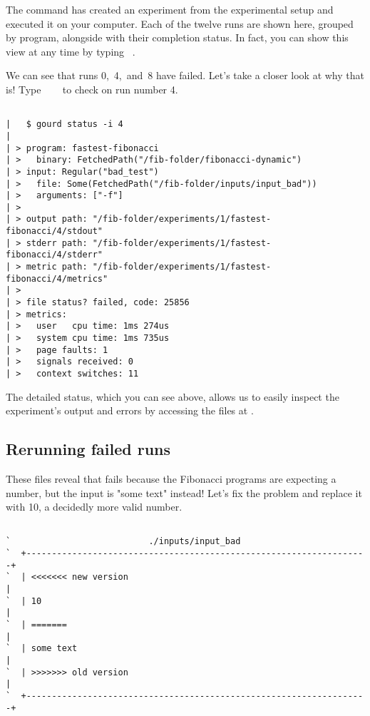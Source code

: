 \documentclass[a4paper,english]{article}
\begin{document}
\begin{adjustwidth}{18pt}{0pt}
    The  command has created an experiment from the experimental
    setup and executed it on your computer. Each of the twelve runs are shown
    here, grouped by program, alongside with their completion status. In fact,
    you can show this view at any time by typing ~.

    We can see that runs 0,~4,~and~8 have failed. Let's take a closer look at
    why that is! Type ~~~ to check on
    run number 4.

    \begin{verbatim}

|   $ gourd status -i 4
|
| > program: fastest-fibonacci
| >   binary: FetchedPath("/fib-folder/fibonacci-dynamic")
| > input: Regular("bad_test")
| >   file: Some(FetchedPath("/fib-folder/inputs/input_bad"))
| >   arguments: ["-f"]
| >
| > output path: "/fib-folder/experiments/1/fastest-fibonacci/4/stdout"
| > stderr path: "/fib-folder/experiments/1/fastest-fibonacci/4/stderr"
| > metric path: "/fib-folder/experiments/1/fastest-fibonacci/4/metrics"
| >
| > file status? failed, code: 25856
| > metrics:
| >   user   cpu time: 1ms 274us
| >   system cpu time: 1ms 735us
| >   page faults: 1
| >   signals received: 0
| >   context switches: 11

    \end{verbatim}

    The detailed status, which you can see above, allows us to easily inspect
    the experiment's output and errors by accessing the files at
    .

    \subsection{Rerunning failed runs}

    These files reveal that  fails because the Fibonacci
    programs are expecting a number, but the input is "some text" instead!
    Let's fix the problem and replace it with 10, a decidedly more valid
    number.

    \begin{verbatim}

`                           ./inputs/input_bad
`  +-------------------------------------------------------------------+
`  | <<<<<<< new version                                               |
`  | 10                                                                |
`  | =======                                                           |
`  | some text                                                         |
`  | >>>>>>> old version                                               |
`  +-------------------------------------------------------------------+


\end{verbatim}
\end{adjustwidth}
\end{document}
